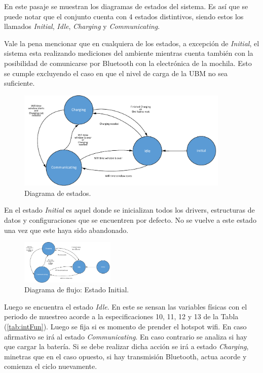 En este pasaje se muestran los diagramas de estados del sistema. Es así que se puede notar que el conjunto cuenta con 4 estados distintivos, siendo estos los llamados \textit{Initial}, \textit{Idle}, \textit{Charging} y \textit{Communicating}.

Vale la pena mencionar que en cualquiera de los estados, a excepción de \textit{Initial}, el sistema esta realizando mediciones del ambiente mientras cuenta también con la posibilidad de comunicarse por Bluetooth con la electrónica de la mochila. Esto se cumple excluyendo el caso en que el nivel de carga de la UBM no sea suficiente.

\begin{figure}[H]
	\centering
	\includegraphics[width=0.9\textwidth, page=1]{ImagenesIngenieria de Detalle/FlowChart.pdf}	
	\caption{Diagrama de estados.}
	\label{fig:Diagrama_de_Estados}
\end{figure}

En el estado \textit{Initial} es aquel donde se inicializan todos los drivers, estructuras de datos y configuraciones que se encuentren por defecto. No se vuelve a este estado una vez que este haya sido abandonado. 

\begin{figure}[H]
	\centering
	\includegraphics[width=0.4\textwidth, page=5]{ImagenesIngenieria de Detalle/FlowChart.pdf}	
	\caption{Diagrama de flujo: Estado Initial.}
	\label{fig:Diagrama_de_flujo_init}
\end{figure}

Luego se encuentra el estado \textit{Idle}. En este se sensan las variables físicas con el periodo de muestreo acorde a la especificaciones 10, 11, 12 y 13 de la Tabla (\ref{tab:intFun}). Luego se fija si es momento de prender el hotspot wifi. En caso afirmativo se irá al estado \textit{Communicating}. En caso contrario se analiza si hay que cargar la batería. Si se debe realizar dicha acción se irá a estado \textit{Charging}, minetras que en el caso opuesto, si hay transmisión Bluetooth, actua acorde y comienza el ciclo nuevamente.

